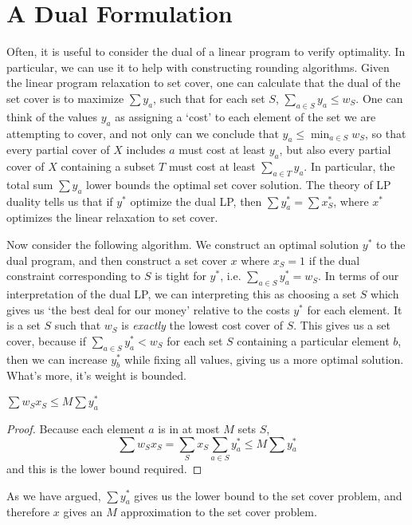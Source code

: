 \section{A Dual Formulation}

Often, it is useful to consider the dual of a linear program to verify optimality. In particular, we can use it to help with constructing rounding algorithms. Given the linear program relaxation to set cover, one can calculate that the dual of the set cover is to maximize $\sum y_a$, such that for each set $S$, $\sum_{a \in S} y_a \leq w_S$. One can think of the values $y_a$ as assigning a `cost' to each element of the set we are attempting to cover, and not only can we conclude that $y_a \leq \min_{a \in S} w_S$, so that every partial cover of $X$ includes $a$ must cost at least $y_a$, but also every partial cover of $X$ containing a subset $T$ must cost at least $\sum_{a \in T} y_a$. In particular, the total sum $\sum y_a$ lower bounds the optimal set cover solution. The theory of LP duality tells us that if $y^*$ optimize the dual LP, then $\sum y^*_a = \sum x^*_S$, where $x^*$ optimizes the linear relaxation to set cover.

Now consider the following algorithm. We construct an optimal solution $y^*$ to the dual program, and then construct a set cover $x$ where $x_S = 1$ if the dual constraint corresponding to $S$ is tight for $y^*$, i.e. $\sum_{a \in S} y^*_a = w_S$. In terms of our interpretation of the dual LP, we can interpreting this as choosing a set $S$ which gives us `the best deal for our money' relative to the costs $y^*$ for each element. It is a set $S$ such that $w_S$ is {\it exactly} the lowest cost cover of $S$. This gives us a set cover, because if $\sum_{a \in S} y^*_a < w_S$ for each set $S$ containing a particular element $b$, then we can increase $y^*_b$ while fixing all values, giving us a more optimal solution. What's more, it's weight is bounded.

\begin{lemma}
    $\sum w_S x_S \leq M \sum y_a^*$
\end{lemma}
\begin{proof}
    Because each element $a$ is in at most $M$ sets $S$,
    \[ \sum w_S x_S = \sum_S x_S \sum_{a \in S} y^*_a \leq M \sum y^*_a \]
    and this is the lower bound required.
\end{proof}

As we have argued, $\sum y_a^*$ gives us the lower bound to the set cover problem, and therefore $x$ gives an $M$ approximation to the set cover problem.

